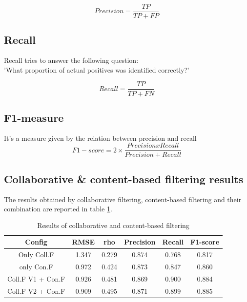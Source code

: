 \documentclass{article}
\begin{document}
\begin{equation}
      Precision = \frac{TP}{TP + FP}
\end{equation}
\subsection{Recall}
Recall tries to answer the following question:\\
'What proportion of actual positives was identified correctly?'

\begin{equation}
      Recall = \frac{TP}{TP + FN}
\end{equation}

\subsection{F1-measure}
It's a measure given by the relation between precision and recall
\begin{equation}
    F1-score = 2 \times \frac{Precision x Recall}{Precision + Recall}
\end{equation}

\subsection{Collaborative \& content-based filtering results}

The results obtained by collaborative filtering, content-based filtering and their combination are reported in table \ref{FilteringResults}.

\begin{table}[h]
      \begin{tabular}{ | c | c | c | c | c | c |} 
        \hline
        \rowcolor{lightgray} Config & RMSE & rho & Precision & Recall & F1-score \\ 
        \hline
         \cellcolor{lightgray} Only Coll.F & 1.347 & 0.279 & 0.874 & 0.768 & 0.817 \\ 
        \hline
        \cellcolor{lightgray} only Con.F & 0.972 & 0.424 & 0.873 & 0.847 & 0.860 \\ 
        \hline
        \cellcolor{lightgray}Coll.F V1 + Con.F & 0.926 & 0.481 & 0.869 & 0.900 & 0.884\\
        \hline
        \cellcolor{lightgray}Coll.F V2 + Con.F & 0.909 & 0.495 & 0.871 & 0.899 & 0.885\\
        \hline
      \end{tabular}
    \caption{Results of collaborative and content-based filtering}
    \label{FilteringResults}
\end{table}
\end{document}
